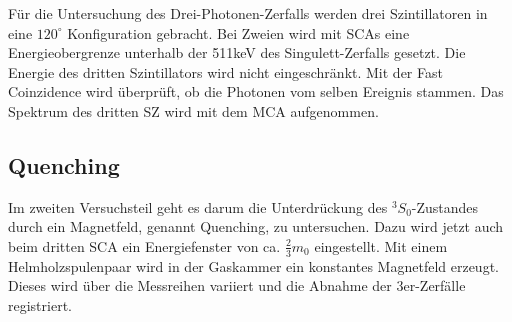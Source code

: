 Für die Untersuchung des Drei-Photonen-Zerfalls werden drei Szintillatoren in eine $120^\circ$ Konfiguration gebracht. Bei Zweien wird mit SCAs eine Energieobergrenze unterhalb der 511keV des Singulett-Zerfalls gesetzt. Die Energie des dritten Szintillators wird nicht eingeschränkt. Mit der Fast Coinzidence wird überprüft, ob die Photonen vom selben Ereignis stammen. Das Spektrum des dritten SZ wird mit dem MCA aufgenommen. 

\subsection{Quenching}

Im zweiten Versuchsteil geht es darum die Unterdrückung des ${}^3S_0$-Zustandes durch ein Magnetfeld, genannt Quenching, zu untersuchen. Dazu wird jetzt auch beim dritten SCA ein Energiefenster von ca. $\frac{2}{3} m_0$ eingestellt. Mit einem Helmholzspulenpaar wird in der Gaskammer ein konstantes Magnetfeld erzeugt. Dieses wird über die Messreihen variiert und die Abnahme der 3er-Zerfälle registriert.